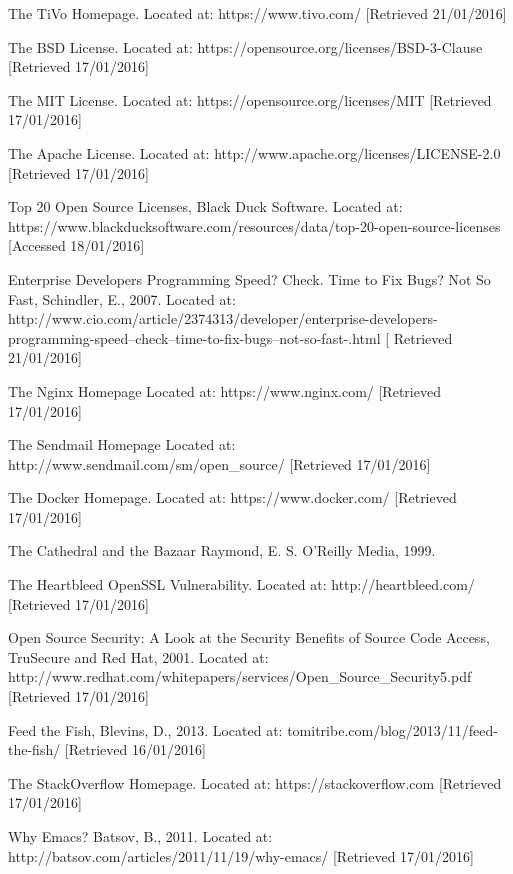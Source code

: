 \begin{thebibliography}{100}
 The TiVo Homepage.
  Located at: https://www.tivo.com/ [Retrieved 21/01/2016]

 The BSD License.
	Located at: https://opensource.org/licenses/BSD-3-Clause [Retrieved 17/01/2016]

 The MIT License.
	Located at: https://opensource.org/licenses/MIT [Retrieved 17/01/2016]

 The Apache License.
	Located at: http://www.apache.org/licenses/LICENSE-2.0 [Retrieved 17/01/2016]

 Top 20 Open Source Licenses,
	Black Duck Software.
	Located at: https://www.blackducksoftware.com/resources/data/top-20-open-source-licenses [Accessed 18/01/2016]
    
 Enterprise Developers Programming Speed? Check. Time to Fix Bugs? Not So Fast,
  Schindler, E.,
  2007.
  Located at: http://www.cio.com/article/2374313/developer/enterprise-developers-programming-speed--check--time-to-fix-bugs--not-so-fast-.html [ Retrieved 21/01/2016]

 The Nginx Homepage
  Located at: https://www.nginx.com/ [Retrieved 17/01/2016]

 The Sendmail Homepage
  Located at: http://www.sendmail.com/sm/open\_source/ [Retrieved 17/01/2016]

 The Docker Homepage.
  Located at: https://www.docker.com/ [Retrieved 17/01/2016]

 The Cathedral and the Bazaar
  Raymond, E. S.
  O'Reilly Media,
  1999.

 The Heartbleed OpenSSL Vulnerability.
  Located at: http://heartbleed.com/ [Retrieved 17/01/2016]

 Open Source Security: A Look at the Security Benefits of Source Code Access,
  TruSecure and Red Hat,
  2001.
  Located at: http://www.redhat.com/whitepapers/services/Open\_Source\_Security5.pdf [Retrieved 17/01/2016]

 Feed the Fish,
  Blevins, D.,
  2013.
  Located at: tomitribe.com/blog/2013/11/feed-the-fish/ [Retrieved 16/01/2016]

 The StackOverflow Homepage.
  Located at: https://stackoverflow.com [Retrieved 17/01/2016]

 Why Emacs?
  Batsov, B.,
  2011.
  Located at: http://batsov.com/articles/2011/11/19/why-emacs/ [Retrieved 17/01/2016]
  

\end{thebibliography}
